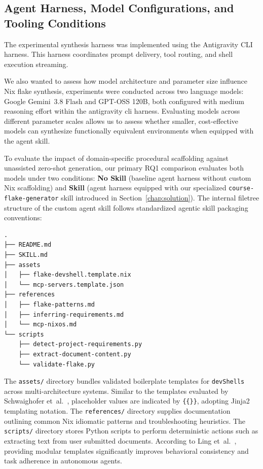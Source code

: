 \subsection{Agent Harness, Model Configurations, and Tooling Conditions}
\label{subsec:agent-harness}

The experimental synthesis harness was implemented using the Antigravity CLI harness.
This harness coordinates prompt delivery, tool routing, and shell execution
streaming.

We also wanted to assess how model architecture and parameter size influence Nix
flake synthesis, experiments were conducted across two language models: Google
Gemini~3.8 Flash and GPT-OSS 120B, both configured with medium reasoning effort within
the antigravity cli harness. Evaluating models across different parameter scales
allows us to assess whether smaller, cost-effective models can synthesize functionally
equivalent environments when equipped with the agent skill.

To evaluate the impact of domain-specific procedural scaffolding against unassisted
zero-shot generation, our primary RQ1 comparison evaluates both models under two
conditions: \textbf{No Skill} (baseline agent harness without custom Nix scaffolding)
and \textbf{Skill} (agent harness equipped with our specialized \texttt{course-flake-generator}
skill introduced in Section~\ref{chap:solution}). The internal filetree structure
of the custom agent skill follows standardized agentic skill packaging conventions:

\begin{lstlisting}[caption={Custom Skill Filetree Structure}, label={lst:custom-skill-filetree}]
.
├── README.md
├── SKILL.md
├── assets
│   ├── flake-devshell.template.nix
│   └── mcp-servers.template.json
├── references
│   ├── flake-patterns.md
│   ├── inferring-requirements.md
│   └── mcp-nixos.md
└── scripts
    ├── detect-project-requirements.py
    ├── extract-document-content.py
    └── validate-flake.py

\end{lstlisting}

The \texttt{assets/} directory bundles validated boilerplate templates for \texttt{devShells}
across multi-architecture systems. Similar to the templates evaluated by Schwaighofer
et~al.~\cite{schwaighoferVibenixAIAssistant2026}, placeholder values are indicated
by \texttt{\{\{\}\}}, adopting Jinja2 templating notation. The \texttt{references/}
directory supplies documentation outlining common Nix idiomatic patterns and troubleshooting
heuristics. The \texttt{scripts/} directory stores Python scripts to perform deterministic
actions such as extracting text from user submitted documents. According to Ling
et~al.~\cite{lingAgentSkillsDataDriven2026}, providing modular templates
significantly improves behavioral consistency and task adherence in autonomous
agents.

